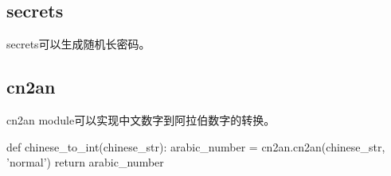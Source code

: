   \subsection{secrets}
    secrets可以生成随机长密码。

  \subsection{cn2an}
    cn2an module可以实现中文数字到阿拉伯数字的转换。
    \begin{codeblock}[language=python, caption={cn2an}]
      def chinese_to_int(chinese_str):
          arabic_number = cn2an.cn2an(chinese_str, 'normal')
          return arabic_number
    \end{codeblock}
